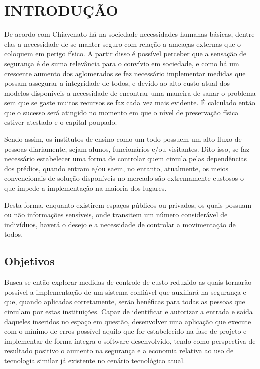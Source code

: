 \chapter{INTRODUÇÃO}
\label{cap:introducao}

De acordo com Chiavenato \cite{chiavenato2003introducao} há na sociedade necessidades humanas básicas,
dentre elas a necessidade de se manter seguro com relação a ameaças externas
que o coloquem em perigo físico. A partir disso é possível perceber que a sensação
de segurança é de suma relevância para o convívio em sociedade, e como há um crescente
aumento dos aglomerados se fez necessário implementar medidas que possam assegurar a
integridade de todos, e devido ao alto custo atual dos modelos disponíveis a necessidade
de encontrar uma maneira de sanar o problema sem que se gaste muitos recursos se faz
cada vez mais evidente. É calculado então que o sucesso será atingido no momento em que
o nível de preservação física estiver atestado e o capital poupado.


Sendo assim, os institutos de ensino como um todo possuem um alto fluxo de pessoas
diariamente, sejam alunos, funcionários e/ou visitantes. Dito isso, se faz necessário
estabelecer uma forma de controlar quem circula pelas dependências dos prédios, quando
entram e/ou saem, no entanto, atualmente, os meios convencionais de solução disponíveis
no mercado são extremamente custosos o que impede a implementação na maioria dos lugares.


Desta forma, enquanto existirem espaços públicos ou privados, os quais possuam ou não
informações sensíveis, onde transitem um número considerável de indivíduos, haverá o
desejo e a necessidade de controlar a movimentação de todos.

\section{Objetivos}

Busca-se então explorar medidas de controle de custo reduzido as quais tornarão
possível a implementação de um sistema confiável que auxiliará na segurança e que,
quando aplicadas corretamente, serão benéficas para todas as pessoas que circulam
por estas instituições. Capaz de identificar e autorizar a entrada e saída daqueles
inseridos no espaço em questão, desenvolver uma aplicação que execute com o mínimo
de erros possível aquilo que for estabelecido na fase de projeto e implementar de
forma íntegra o software desenvolvido, tendo como perspectiva de resultado positivo
o aumento na segurança e a economia relativa ao uso de tecnologia similar já existente
no cenário tecnológico atual.

